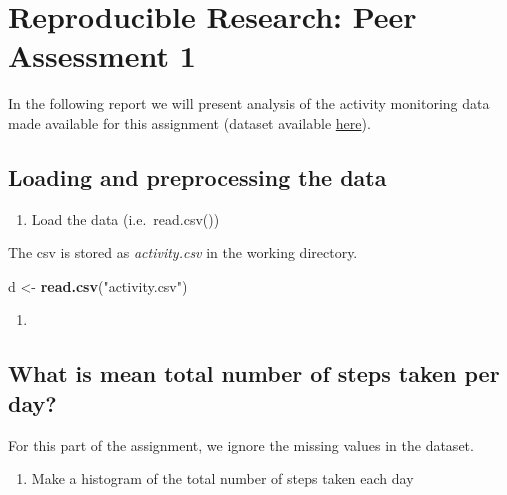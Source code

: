 \documentclass[]{article}
\title{}
\author{}
\date{}
\newenvironment{Shaded}{\begin{snugshade}}{\end{snugshade}}
\newcommand{\KeywordTok}[1]{\textcolor[rgb]{0.13,0.29,0.53}{\textbf{{#1}}}}
\newcommand{\StringTok}[1]{\textcolor[rgb]{0.31,0.60,0.02}{{#1}}}
\newcommand{\NormalTok}[1]{{#1}}
\providecommand{\tightlist}{%
  \setlength{\itemsep}{0pt}\setlength{\parskip}{0pt}}
\begin{document}
\section{Reproducible Research: Peer Assessment
1}\label{reproducible-research-peer-assessment-1}

In the following report we will present analysis of the activity
monitoring data made available for this assignment (dataset available
\href{https://d396qusza40orc.cloudfront.net/repdata\%2Fdata\%2Factivity.zip}{here}).

\subsection{Loading and preprocessing the
data}\label{loading-and-preprocessing-the-data}

\begin{enumerate}
\def\labelenumi{\arabic{enumi}.}
\tightlist
\item
  Load the data (i.e.~read.csv())
\end{enumerate}

The csv is stored as \emph{activity.csv} in the working directory.

\begin{Shaded}
\begin{Highlighting}[]
\NormalTok{d <-}\StringTok{ }\KeywordTok{read.csv}\NormalTok{(}\StringTok{"activity.csv"}\NormalTok{)}
\end{Highlighting}
\end{Shaded}

\begin{enumerate}
\def\labelenumi{\arabic{enumi}.}
\setcounter{enumi}{1}
\item
\end{enumerate}

\subsection{What is mean total number of steps taken per
day?}\label{what-is-mean-total-number-of-steps-taken-per-day}

For this part of the assignment, we ignore the missing values in the
dataset.

\begin{enumerate}
\def\labelenumi{\arabic{enumi}.}
\tightlist
\item
  Make a histogram of the total number of steps taken each day
\end{enumerate}
\end{document}

